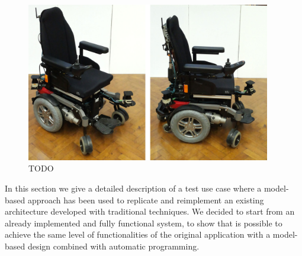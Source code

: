 \begin{figure}[t]
\centering
\includegraphics[width=0.95\textwidth]{gfx/pmk/pmk_plat}
\caption{TODO}
\label{fig:pmk}
\end{figure}

In this section we give a detailed description of a test use case where a model-based approach has been used to replicate and reimplement an existing architecture developed with traditional techniques. We decided to start from an already implemented and fully functional system, to show that is possible to achieve the same level of functionalities of the original application with a model-based design combined with automatic programming.

